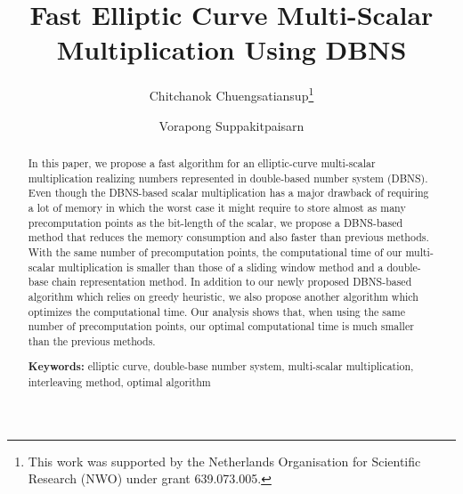 \documentclass[a4paper,11pt,runningheads]{llncs}
\begin{document}
\title{Fast Elliptic Curve Multi-Scalar Multiplication Using DBNS} %

\author{
Chitchanok Chuengsatiansup\thanks{This work was supported by the Netherlands Organisation for Scientific Research (NWO) under grant 639.073.005.}
\and
Vorapong Suppakitpaisarn
}


\maketitle

\begin{abstract}
In this paper, we propose a fast algorithm for an elliptic-curve multi-scalar multiplication realizing numbers represented in double-based number system (DBNS).
Even though the DBNS-based scalar multiplication has a major drawback of requiring a lot of memory
in which the worst case it might require to store almost as many precomputation points as the bit-length of the scalar,
we propose a DBNS-based method that reduces the memory consumption and also faster than previous methods.
With the same number of precomputation points, the computational time of our multi-scalar multiplication is smaller than
those of a sliding window method and a double-base chain representation method.
In addition to our newly proposed DBNS-based algorithm which relies on greedy heuristic,
we also propose another algorithm which optimizes the computational time.
Our analysis shows that, when using the same number of precomputation points, our optimal computational time is much smaller than the previous methods.

\smallskip
\textbf{Keywords:} 
elliptic curve, double-base number system, multi-scalar multiplication, interleaving method, optimal algorithm
\end{abstract}






\clearpage


\end{document}
